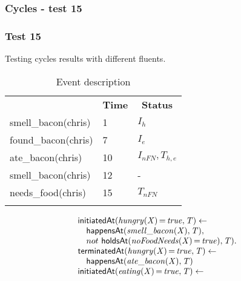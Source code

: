 \documentclass[8pt]{beamer}
\DeclareMathOperator{\val}{=}  %
\def \patsize {}
\def\happensAt{\textsf{\patsize happensAt}}
\def\holdsAt{\textsf{\patsize holdsAt}}
\def\initiatedAt{\textsf{\patsize initiatedAt}}
\def\terminatedAt{\textsf{\patsize terminatedAt}}
\newenvironment{mysplit}%
  {\arraycolsep 0pt \begin{array}{l}}%
  {\end{array}}
\begin{document}
\begin{frame}
    \frametitle{Cycles - test 15}
    \subsubsection{Test 15}
    \small
    Testing cycles results with different fluents.\linebreak
    \begin{minipage}{0.4\linewidth}
        \begin{table}[t!]
            \caption{Event description}
            \begin{center}

                \begin{tabular}{lll}
                    \hline\noalign{\smallskip}
                    \multicolumn{1}{l}{\textbf{Event}} & \multicolumn{1}{c}{\textbf{Time}} & \multicolumn{1}{c}{\textbf{Status}} \\
                    smell\_bacon(chris)& 1 & $I_{h}$\\
                    found\_bacon(chris)& 7 & $I_{e}$\\
                    ate\_bacon(chris)& 10  & $I_{nFN},T_{h,e}$\\
                    smell\_bacon(chris)& 12 & -\\
                    needs\_food(chris)& 15 & $T_{nFN}$\\
                    \noalign{\smallskip}
                    \hline
                \end{tabular}
            \end{center}
        \end{table}
    \end{minipage}
    \begin{minipage}{0.55\linewidth}
        \begin{align*}
            \begin{mysplit}
                \initiatedAt\mathit{(hungry(X)\val true,T)\leftarrow}\\
                \quad    \happensAt\mathit{(smell\_bacon(X),T),}\\
                \quad    not\ \holdsAt\mathit{(noFoodNeeds(X)\val true),T).}\\
                \terminatedAt\mathit{(hungry(X)\val true,T)\leftarrow}\\
                \quad    \happensAt\mathit{(ate\_bacon(X),T)}\\
                \initiatedAt\mathit{(eating(X)\val true,T)\leftarrow}\\

\end{mysplit}
\end{align*}
\end{minipage}
\end{frame}
\end{document}

